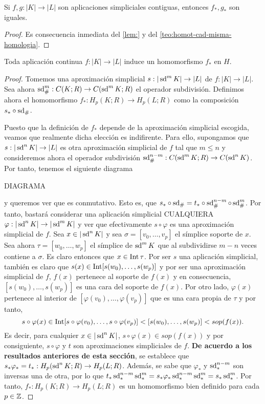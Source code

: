 \begin{corolario}
	Si $f,g : |K| \to |L|$ son aplicaciones simpliciales contiguas, entonces $f_*,g_*$ son iguales.
\end{corolario}
\begin{proof}
	Es consecuencia inmediata del \autoref{lem:} y del \autoref{teo:homot-cad-misma-homologia}.
\end{proof}

\begin{teorema}
	Toda aplicación continua $f: |K| \to |L|$ induce un homomorfismo $f_*$ en $H$.
\end{teorema}
\begin{proof}
	Tomemos una aproximación simplicial $s : |\operatorname{sd}^m K| \to |L|$ de $f: |K| \to |L|$. Sea ahora $\operatorname{sd}_\#^m : C(K;R) \to C(\operatorname{sd}^m K; R)$ el operador subdivisión. Definimos ahora el homomorfismo $f_* : H_p(K;R) \to H_p(L;R)$ como la composición $s_* \circ \operatorname{sd}_\#$.
	
	Puesto que la definición de $f_*$ depende de la aproximación simplicial escogida, veamos que realmente dicha elección es indifirente. Para ello, supongamos que $s : |\operatorname{sd}^n K| \to |L|$ es otra aproximación simplicial de $f$ tal que $m \leq n$ y consideremos ahora el operador subdivisión $\operatorname{sd}_\#^{n-m} : C(\operatorname{sd}^m K;R) \to C(\operatorname{sd}^n K)$. Por tanto, tenemos el siguiente diagrama
	
	DIAGRAMA
	
	y queremos ver que es conmutativo. Esto es, que $s_* \circ \operatorname{sd}_\# = t_* \circ \operatorname{sd}_\#^{n-m} \circ \operatorname{sd}_\#^{m}$. Por tanto, bastará considerar una aplicación simplicial CUALQUIERA $\varphi : |\operatorname{sd}^n K| \to |\operatorname{sd}^m K|$ y ver que efectivamente $s \circ \varphi$ es una aproximación simplicial de $f$. Sea $x \in |\operatorname{sd}^n K|$ y sea $\sigma = [v_0, \dots, v_p]$ el símplice soporte de $x$. Sea ahora $\tau = [w_0, \dots, w_p]$ el símplice de $\operatorname{sd}^m K$ que al subdividirse $m-n$ veces contiene a $\sigma$. Es claro entonces que $x \in \operatorname{Int} \tau$. Por ser $s$ una aplicación simplicial, también es claro que $s(x) \in \operatorname{Int} [s(w_0), \dots, s(w_p)]$ y por ser una aproximación simplicial de $f$, $f(x)$ pertenece al soporte de $f(x)$ y en consecuencia, $[s(w_0), \dots, s(w_p)]$ es una cara del soporte de $f(x)$. Por otro lado, $\varphi(x)$ pertenece al interior de $[\varphi(v_0), \dots, \varphi(v_p)]$ que es una cara propia de $\tau$ y por tanto,
	\[
		s \circ \varphi(x) \in \operatorname{Int} [s \circ \varphi(v_0), \dots, s \circ \varphi(v_p)] < [s(w_0), \dots, s(w_p)] < sop(f(x)).
	\]
	Es decir, para cualquier $x \in |\operatorname{sd}^n K|$, $s \circ \varphi(x) \in sop(f(x))$ y por consiguiente, $s \circ \varphi$ y $t$ son aproximaciones simpliciales de $f$. \textbf{De acuerdo a los resultados anteriores de esta sección}, se establece que $s_*\varphi_* = t_* : H_p(\operatorname{sd}^n K;R) \to H_p(L;R)$. Además, se sabe que $\varphi_*$ y $\operatorname{sd}_*^{n-m}$ son inversas una de otra, por lo que $t_* \operatorname{sd}_*^{n-m} \operatorname{sd}_*^m = s_*\varphi_*\operatorname{sd}_*^{n-m} \operatorname{sd}_*^m = s_* \operatorname{sd}_*^m$. Por tanto, $f_* : H_p(K;R) \to H_p(L;R)$ es un homomorfismo bien definido para cada $p \in \mathbb{Z}$.
\end{proof}


